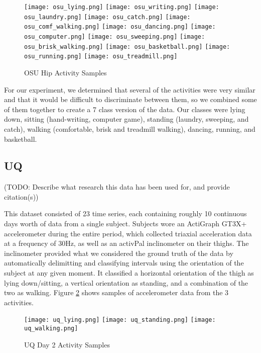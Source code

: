 \begin{figure}
 \centering
 \texttt{[image: osu\_lying.png]}
 \texttt{[image: osu\_writing.png]}
 \texttt{[image: osu\_laundry.png]}
 \texttt{[image: osu\_catch.png]}
 \texttt{[image: osu\_comf\_walking.png]}
 \texttt{[image: osu\_dancing.png]}
 \texttt{[image: osu\_computer.png]}
 \texttt{[image: osu\_sweeping.png]}
 \texttt{[image: osu\_brisk\_walking.png]}
 \texttt{[image: osu\_basketball.png]}
 \texttt{[image: osu\_running.png]}
 \texttt{[image: osu\_treadmill.png]}
 \caption{OSU Hip Activity Samples}
 \label{fig:osu_activities}
\end{figure}

For our experiment, we determined that several of the activities were very similar and that
it would be difficult to discriminate between them, so we combined some of them together to
create a 7 class version of the data.
Our classes were lying down, sitting (hand-writing, computer game),
standing (laundry, sweeping, and catch), walking (comfortable, brisk and treadmill walking),
dancing, running, and basketball.

\subsection{UQ}
(TODO: Describe what research this data has been used for, and provide citation(s))

This dataset consisted of 23 time series, each containing roughly 10 continuous
days worth of data from a single subject. Subjects wore an ActiGraph GT3X+
accelerometer during the entire period, which collected triaxial acceleration data at a frequency
of 30Hz, as well as an activPal inclinometer on their thighs. The inclinometer
provided what we considered the ground truth of the data by automatically
delimitting and classifying intervals using the orientation of the subject at any given moment. It 
classified a horizontal orientation of the thigh as lying down/sitting,
a vertical orientation as standing, and a combination of the two as walking. Figure
\ref{fig:uq_activities} shows samples of accelerometer data from the 3 activities.

\begin{figure}
 \centering
 \texttt{[image: uq\_lying.png]}
 \texttt{[image: uq\_standing.png]}
 \texttt{[image: uq\_walking.png]}
 \caption{UQ Day 2 Activity Samples}
 \label{fig:uq_activities}
\end{figure}

